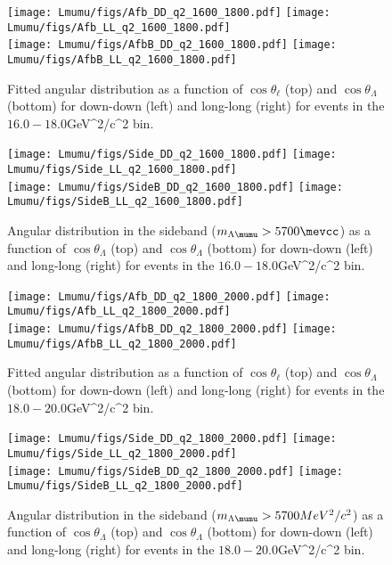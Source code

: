 

\begin{figure}[!htb]
\centering
\texttt{[image: Lmumu/figs/Afb\_DD\_q2\_1600\_1800.pdf]}
\texttt{[image: Lmumu/figs/Afb\_LL\_q2\_1600\_1800.pdf]} \\
\texttt{[image: Lmumu/figs/AfbB\_DD\_q2\_1600\_1800.pdf]}
\texttt{[image: Lmumu/figs/AfbB\_LL\_q2\_1600\_1800.pdf]}
\caption{Fitted angular distribution as a function of $\cos\theta_\ell$ (top) and $\cos\theta_\Lambda$ (bottom) for down-down (left) and long-long (right) for events in the $16.0-18.0$GeV^2/c^2$$ \qsq bin.  }
\end{figure}


\begin{figure}[!htb]
\centering
\texttt{[image: Lmumu/figs/Side\_DD\_q2\_1600\_1800.pdf]}
\texttt{[image: Lmumu/figs/Side\_LL\_q2\_1600\_1800.pdf]} \\
\texttt{[image: Lmumu/figs/SideB\_DD\_q2\_1600\_1800.pdf]}
\texttt{[image: Lmumu/figs/SideB\_LL\_q2\_1600\_1800.pdf]}
\caption{Angular distribution in the sideband ($m_{\Lambda\mumu} > 5700 \mevcc$) as a function of $\cos\theta_\Lambda$ (top) and $\cos\theta_\Lambda$ (bottom) for down-down (left) and long-long (right) for events in the $16.0-18.0$GeV^2/c^2$$ \qsq bin.  }
\end{figure}





\begin{figure}[!htb]
\centering
\texttt{[image: Lmumu/figs/Afb\_DD\_q2\_1800\_2000.pdf]}
\texttt{[image: Lmumu/figs/Afb\_LL\_q2\_1800\_2000.pdf]} \\
\texttt{[image: Lmumu/figs/AfbB\_DD\_q2\_1800\_2000.pdf]}
\texttt{[image: Lmumu/figs/AfbB\_LL\_q2\_1800\_2000.pdf]}
\caption{Fitted angular distribution as a function of $\cos\theta_\ell$ (top) and $\cos\theta_\Lambda$ (bottom) for down-down (left) and long-long (right) for events in the $18.0-20.0$GeV^2/c^2$$ \qsq bin.  }
\end{figure}


\begin{figure}[!htb]
\centering
\texttt{[image: Lmumu/figs/Side\_DD\_q2\_1800\_2000.pdf]}
\texttt{[image: Lmumu/figs/Side\_LL\_q2\_1800\_2000.pdf]} \\
\texttt{[image: Lmumu/figs/SideB\_DD\_q2\_1800\_2000.pdf]}
\texttt{[image: Lmumu/figs/SideB\_LL\_q2\_1800\_2000.pdf]}
\caption{Angular distribution in the sideband ($m_{\Lambda\mumu} > 5700 MeV^{2}/c^{2}$) as a function of $\cos\theta_\Lambda$ (top) and $\cos\theta_\Lambda$ (bottom) for down-down (left) and long-long (right) for events in the $18.0-20.0$GeV^2/c^2$$ \qsq bin.  }
\end{figure}







\clearpage
